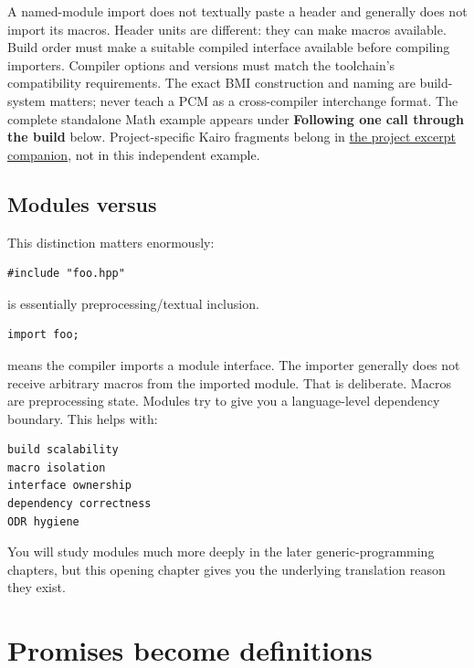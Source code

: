 A named-module import does not textually paste a header and generally does not import its macros. Header units are different: they can make macros available. Build order must make a suitable compiled interface available before compiling importers. Compiler options and versions must match the toolchain's compatibility requirements. The exact BMI construction and naming are build-system matters; never teach a PCM as a cross-compiler interchange format. The complete standalone Math example appears under \textbf{Following one call through the build} below. Project-specific Kairo fragments belong in \hyperref[appendix-4e2236f53445-source-reported-c-project-excerpts]{the project excerpt companion}, not in this independent example.

\subsection{\texorpdfstring{Modules versus }{Modules versus }}\label{01-foundations-i-ch002-modules-versus-include}

\hypertarget{01-foundations-i-ch002-modules-versus-include}{}

This distinction matters enormously:

\begin{verbatim}
#include "foo.hpp"
\end{verbatim}

is essentially preprocessing/textual inclusion.

\begin{verbatim}
import foo;
\end{verbatim}

means the compiler imports a module interface. The importer generally does not receive arbitrary macros from the imported module. That is deliberate. Macros are preprocessing state. Modules try to give you a language-level dependency boundary. This helps with:

\begin{verbatim}
build scalability
macro isolation
interface ownership
dependency correctness
ODR hygiene
\end{verbatim}

You will study modules much more deeply in the later generic-programming chapters, but this opening chapter gives you the underlying translation reason they exist.

\section{Promises become definitions}\label{01-foundations-i-ch002-promises-become-definitions}

